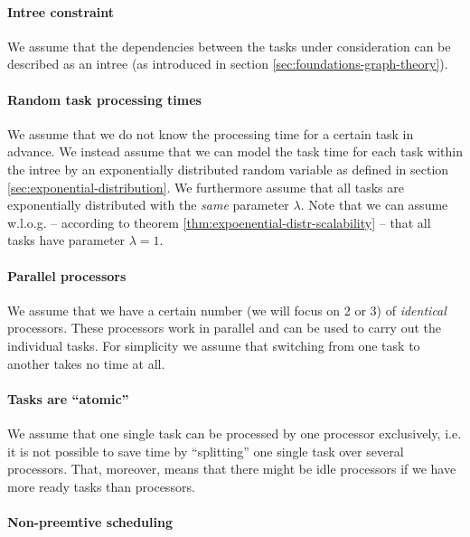 \paragraph{Intree constraint}

We assume that the dependencies between the tasks under consideration can be described as an intree (as introduced in  section \ref{sec:foundations-graph-theory}).

\paragraph{Random task processing times}

We assume that we do not know the processing time for a certain task in advance. We instead assume that we can model the task time for each task within the intree by an exponentially distributed random variable as defined in section \ref{sec:exponential-distribution}. We furthermore assume that all tasks are exponentially distributed with the \emph{same} parameter $\lambda$. Note that we can assume w.l.o.g. --  according to theorem \ref{thm:expoenential-distr-scalability} -- that all tasks have parameter $\lambda=1$. 

\paragraph{Parallel processors}

We assume that we have a certain number (we will focus on 2 or 3) of \emph{identical} processors. These processors work in parallel and can be used to carry out the individual tasks. For simplicity we assume that switching from one task to another takes no time at all.

\paragraph{Tasks are ``atomic''}

We assume that one single task can be processed by one processor exclusively, i.e. it is not possible to save time by ``splitting'' one single task over several processors. That, moreover, means that there might be idle processors if we have more ready tasks than processors.

\paragraph{Non-preemtive scheduling}

